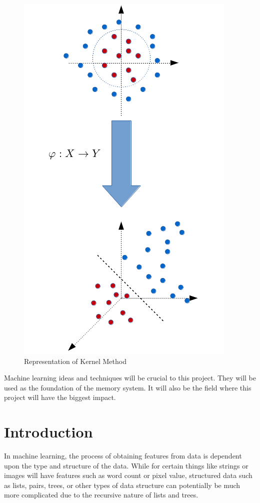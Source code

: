 \documentclass{sig-alternate}
\begin{document}
\begin{figure}[h]
	\begin{center}
		\includegraphics[width=0.75\linewidth]{kernelmeth}
	\end{center}
	\vspace{-12pt}
	\caption{Representation of Kernel Method}
	\label{fig:kernelmeth}
\end{figure}

Machine learning ideas and techniques will be crucial to this project. 
They will be used as the foundation of the memory system. It will also be the field where this 
project will have the biggest impact.

\section{Introduction}
\label{sec:intro}

In machine learning, the process of obtaining features from data is dependent upon
the type and structure of the data. While for certain things like strings or images
will have features such as word count or pixel value, structured data such as lists, pairs, 
trees, or other types of data structure can potentially be much more complicated due to the
recursive nature of lists and trees.
\end{document}
